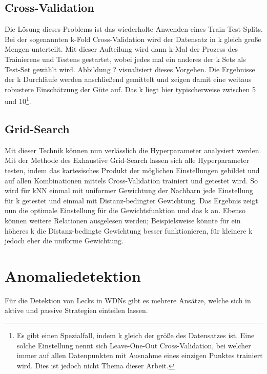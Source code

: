 \subsection*{Cross-Validation}

Die Lösung dieses Problems ist das wiederholte Anwenden eines Train-Test-Splits. Bei der sogenannten
 k-Fold Cross-Validation wird der Datensatz in k gleich große Mengen unterteilt. Mit dieser Aufteilung
 wird dann k-Mal der Prozess des Trainierens und Testens gestartet, wobei jedes mal ein anderes der k Sets als
 Test-Set gewählt wird. Abbildung ? visualisiert dieses Vorgehen. Die Ergebnisse der k Durchläufe werden
 anschließend gemittelt und zeigen damit eine weitaus robustere Einschätzung der Güte auf. Das k liegt hier
 typischerweise zwischen 5 und 10\footnote{Es gibt einen Spezialfall, indem k gleich der größe des Datensatzes
 ist. Eine solche Einstellung nennt sich Leave-One-Out Cross-Validation, bei welcher immer auf allen Datenpunkten
 mit Ausnahme eines einzigen Punktes trainiert wird. Dies ist jedoch nicht Thema dieser Arbeit.}.

\subsection*{Grid-Search}

Mit dieser Technik können nun verlässlich die Hyperparameter analysiert werden. Mit der Methode des Exhaustive
 Grid-Search lassen sich alle Hyperparameter testen, indem das kartesisches Produkt der möglichen Einstellungen
 gebildet und auf allen Kombinationen mittels Cross-Validation trainiert und getestet wird. So wird für kNN einmal
 mit uniformer Gewichtung der Nachbarn jede Einstellung für k getestet und einmal mit Distanz-bedingter Gewichtung.
 Das Ergebnis zeigt nun die optimale Einstellung für die Gewichtsfunktion und das k an. Ebenso können weitere
 Relationen ausgelesen werden; Beispielsweise könnte für ein höheres k die Distanz-bedingte Gewichtung besser
 funktionieren, für kleinere k jedoch eher die uniforme Gewichtung.


\section{Anomaliedetektion}

Für die Detektion von Lecks in WDNs gibt es mehrere Ansätze, welche sich in aktive und passive
 Strategien einteilen lassen.


